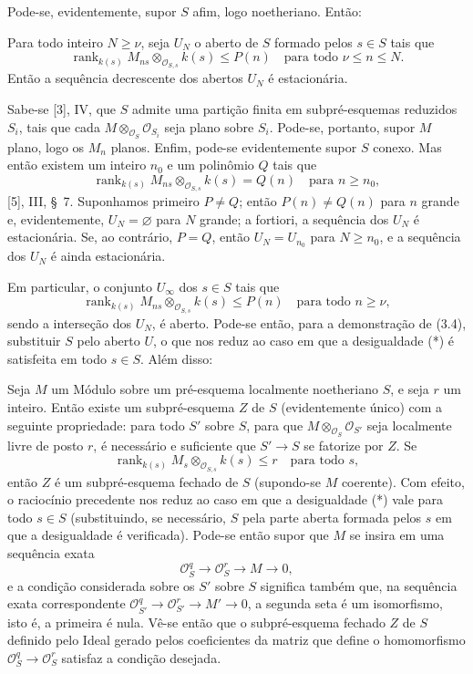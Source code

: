 Pode-se, evidentemente, supor $S$ afim, logo noetheriano. Então:

 Para todo inteiro $N\geq\nu$, seja $U_N$ o aberto de $S$
formado pelos $s\in S$ tais que
\[
\operatorname{rank}_{k(s)}
M_{ns}\otimes_{\mathcal O_{S,s}}k(s)\leq P(n)
\quad\text{para todo $\nu\leq n\leq N$}.
\]
Então a sequência decrescente dos abertos $U_N$ é estacionária.

Sabe-se [3], IV, que $S$ admite uma partição finita em subpré-esquemas
reduzidos $S_i$, tais que cada
$M\otimes_{\mathcal O_S}\mathcal O_{S_i}$ seja plano sobre $S_i$. Pode-se,
portanto, supor $M$ plano, logo os $M_n$ planos. Enfim, pode-se evidentemente
supor $S$ conexo. Mas então existem um inteiro $n_0$ e um polinômio $Q$ tais
que
\[
\operatorname{rank}_{k(s)}
M_{ns}\otimes_{\mathcal O_{S,s}}k(s)=Q(n)
\quad\text{para $n\geq n_0$},
\]
[5], III, \S~7. Suponhamos primeiro $P\neq Q$; então $P(n)\neq Q(n)$ para $n$
grande e, evidentemente, $U_N=\varnothing$ para $N$ grande; a fortiori, a
sequência dos $U_N$ é estacionária. Se, ao contrário, $P=Q$, então $U_N=U_{n_0}$ para $N\geq n_0$, e
a sequência dos $U_N$ é ainda estacionária.

Em particular, o conjunto $U_\infty$ dos $s\in S$ tais que
\[
\tag{*}
\operatorname{rank}_{k(s)}
M_{ns}\otimes_{\mathcal O_{S,s}}k(s)\leq P(n)
\quad\text{para todo $n\geq\nu$},
\]
sendo a interseção dos $U_N$, é aberto. Pode-se então, para a demonstração de
(3.4), substituir $S$ pelo aberto $U$, o que nos reduz ao caso em que a
desigualdade (*) é satisfeita em todo $s\in S$. Além disso:

 Seja $M$ um Módulo sobre um pré-esquema localmente
noetheriano $S$, e seja $r$ um inteiro. Então existe um subpré-esquema $Z$ de
$S$ (evidentemente único) com a seguinte propriedade: para todo $S'$ sobre
$S$, para que $M\otimes_{\mathcal O_S}\mathcal O_{S'}$ seja localmente
livre de posto $r$, é necessário e suficiente que $S'\longrightarrow S$ se
fatorize por $Z$. Se
\[
\operatorname{rank}_{k(s)}
M_s\otimes_{\mathcal O_{S,s}}k(s)\leq r
\quad\text{para todo $s$},
\]
então $Z$ é um subpré-esquema fechado de $S$ (supondo-se $M$ coerente).
Com efeito, o raciocínio precedente nos reduz ao caso em que a desigualdade
(*) vale para todo $s\in S$ (substituindo, se necessário, $S$ pela parte
aberta formada pelos $s$ em que a desigualdade é verificada). Pode-se então
supor que $M$ se insira em uma sequência exata
\[
\mathcal O_S^q\longrightarrow\mathcal O_S^r\longrightarrow M\longrightarrow0,
\]
e a condição considerada sobre os $S'$ sobre $S$ significa também que, na
sequência exata correspondente
$\mathcal O_{S'}^q\longrightarrow\mathcal O_{S'}^r
\longrightarrow M'\longrightarrow0$, a segunda seta é um isomorfismo, isto
é, a primeira é nula. Vê-se então que o subpré-esquema fechado $Z$ de $S$
definido pelo Ideal gerado pelos coeficientes da matriz que define o
homomorfismo $\mathcal O_S^q\longrightarrow\mathcal O_S^r$ satisfaz a
condição desejada.

